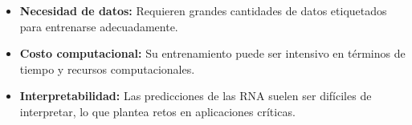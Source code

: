 \begin{itemize}
	\item \textbf{Necesidad de datos:} Requieren grandes cantidades de datos etiquetados para entrenarse adecuadamente.
	\item \textbf{Costo computacional:} Su entrenamiento puede ser intensivo en términos de tiempo y recursos computacionales.
	\item \textbf{Interpretabilidad:} Las predicciones de las RNA suelen ser difíciles de interpretar, lo que plantea retos en aplicaciones críticas.
\end{itemize} 

